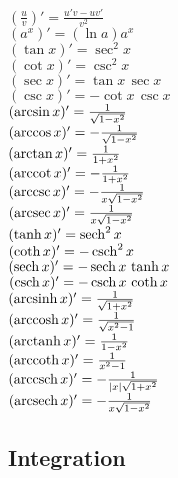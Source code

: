 	\def\arccot{\mathop{\rm arccot}\nolimits}
	\def\arcsec{\mathop{\rm arcsec}\nolimits}
	\def\arccsc{\mathop{\rm arccsc}\nolimits}
	\def\arcsinh{\mathop{\rm arcsinh}\nolimits}
	\def\arccosh{\mathop{\rm arccosh}\nolimits}
	\def\arctanh{\mathop{\rm arctanh}\nolimits}
	\def\arccoth{\mathop{\rm arccoth}\nolimits}
	\def\arcsech{\mathop{\rm arcsech}\nolimits}
	\def\arccsch{\mathop{\rm arccsch}\nolimits}
	\begin{flushleft}
	\begin{multicols}{2}
		$ (\frac{u}{v})' = \frac{u'v - uv'}{v^2} $ \\
		$ (a^x)' = (\ln a) a^x $ \\
		$ (\tan x)' = \sec^2 x $ \\
		$ (\cot x)' = \csc^2 x $ \\
		$ (\sec x)' = \tan x\, \sec x $ \\
		$ (\csc x)' = - \cot x\, \csc x $ \\
		$ (\arcsin x)' = {1 \over \sqrt{1-x^2}} $ \\
		$ (\arccos x)' = -{1 \over \sqrt{1-x^2}} $ \\
		$ (\arctan x)' = {1 \over 1+x^2} $ \\
		$ (\arccot x)' = -{1 \over 1+x^2} $ \\
		$ (\arccsc x)' = -{1 \over x \sqrt{1-x^2}} $ \\
		$ (\arcsec x)' = {1 \over x \sqrt{1-x^2}} $ \\
		$ (\mathop{\rm tanh}\nolimits x)' = \mathop{\rm sech}\nolimits^2 x $ \\
		$ (\mathop{\rm coth}\nolimits x)' = -\mathop{\rm csch}\nolimits^2 x $ \\
		$ (\mathop{\rm sech}\nolimits x)' = -\mathop{\rm sech}\nolimits x \, \mathop{\rm tanh}\nolimits x $ \\
		$ (\mathop{\rm csch}\nolimits x)' = -\mathop{\rm csch}\nolimits x \, \mathop{\rm coth}\nolimits x $ \\
		$ (\arcsinh x)' = {1 \over \sqrt{1+x^2}} $ \\
		$ (\arccosh x)' = {1 \over \sqrt{x^2-1}} $ \\
		$ (\arctanh x)' = {1 \over 1-x^2} $ \\
		$ (\arccoth x)' = {1 \over x^2-1} $ \\
		$ (\arccsch x)' = -{1 \over \vert x \vert \sqrt{1+x^2}} $ \\
		$ (\arcsech x)' = -{1 \over x \sqrt{1-x^2}} $ \\
	\end{multicols}
	\end{flushleft}
\newcommand{\md}{\mathrm{d}}
\newcommand{\me}{\mathrm{e}}
\subsection{Integration}

